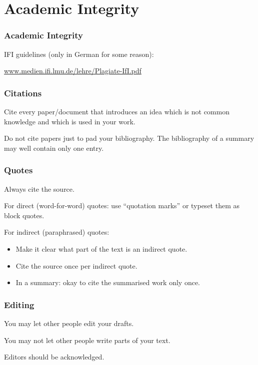 \documentclass[xetex]{beamer}
\begin{document}
\section{Academic Integrity}

\begin{frame}
  \frametitle{Academic Integrity}

  IFI guidelines (only in German for some reason):

  \medskip

  \url{www.medien.ifi.lmu.de/lehre/Plagiate-IfI.pdf}
\end{frame}

\begin{frame}
  \frametitle{Citations}

  Cite every paper/document that introduces an idea which is not common knowledge and which is used in your work.

  \medskip
  \pause

  Do not cite papers just to pad your bibliography.
  The bibliography of a summary may well contain only one entry.
\end{frame}

\begin{frame}
  \frametitle{Quotes}

  Always cite the source.

  \medskip
  \pause

  For direct (word-for-word) quotes: use \enquote{quotation marks} or typeset them as block quotes.

  \medskip
  \pause

  For indirect (paraphrased) quotes:
  \begin{itemize}
    \item Make it clear what part of the text is an indirect quote.
    \item Cite the source once per indirect quote.
    \item In a summary: okay to cite the summarised work only once.
  \end{itemize}
\end{frame}

\begin{frame}
  \frametitle{Editing}

  You may let other people edit your drafts.

  \medskip
  \pause

  You may not let other people write parts of your text.

  \medskip
  \pause

  Editors should be acknowledged.
\end{frame}
\end{document}
